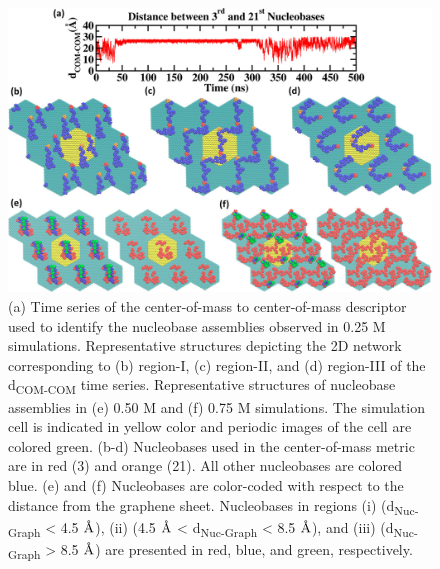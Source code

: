\begin{figure}
    \centering
    \includegraphics[width=\textwidth]{Chapter2/Figures/Figure6.png}
    \caption[Time series of the center-of-mass to center-of-mass descriptor used to identify the nucleobase assemblies observed in 0.25 M simulations. Representative structures depicting the 2D network corresponding to different regions of the d\textsubscript{COM-COM} time series. Representative structures of nucleobase assemblies in 0.50 M and 0.75 M simulations]{(a) Time series of the center-of-mass to center-of-mass descriptor used to identify the nucleobase assemblies observed in 0.25 M simulations. Representative structures depicting the 2D network corresponding to (b) region-I, (c) region-II, and (d) region-III of the d\textsubscript{COM-COM} time series. Representative structures of nucleobase assemblies in (e) 0.50 M and (f) 0.75 M simulations. The simulation cell is indicated in yellow color and periodic images of the cell are colored green. (b-d) Nucleobases used in the center-of-mass metric are in red (3) and orange (21). All other nucleobases are colored blue. (e) and (f) Nucleobases are color-coded with respect to the distance from the graphene sheet. Nucleobases in regions (i) (d\textsubscript{Nuc-Graph} < 4.5 $\text{\normalfont\AA}$), (ii) (4.5 $\text{\normalfont\AA}$ < d\textsubscript{Nuc-Graph} < 8.5 $\text{\normalfont\AA}$), and (iii) (d\textsubscript{Nuc-Graph} > 8.5 $\text{\normalfont\AA}$) are presented in red, blue, and green, respectively.}
\end{figure}

